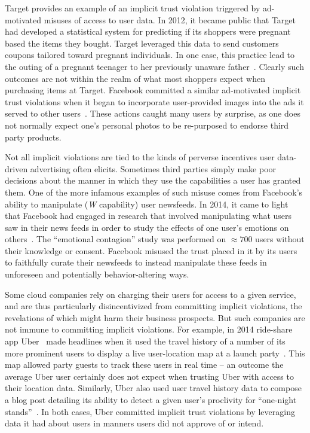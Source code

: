 Target provides an example of an implicit trust violation triggered by
ad-motivated misuses of access to user data. In 2012, it became public
that Target had developed a statistical system for predicting if its
shoppers were pregnant based the items they bought. Target leveraged
this data to send customers coupons tailored toward pregnant
individuals. In one case, this practice lead to the outing of a
pregnant teenager to her previously unaware
father~\cite{hill2012}. Clearly such outcomes are not within the realm
of what most shoppers expect when purchasing items at Target. Facebook
committed a similar ad-motivated implicit trust violations when it
began to incorporate user-provided images into the ads it served to
other users~\cite{mashable-socialads}. These actions caught many users
by surprise, as one does not normally expect one's personal photos to
be re-purposed to endorse third party products.

Not all implicit violations are tied to the kinds of perverse
incentives user data-driven advertising often elicits. Sometimes third
parties simply make poor decisions about the manner in which they use
the capabilities a user has granted them. One of the more infamous
examples of such misuse comes from Facebook's ability to manipulate
(\emph{W} capability) user newsfeeds. In 2014, it came to light that
Facebook had engaged in research that involved manipulating what users
saw in their news feeds in order to study the effects of one user's
emotions on others~\cite{goel2014}. The ``emotional contagion'' study
was performed on $\approx700$ users without their knowledge or
consent. Facebook misused the trust placed in it by its users to
faithfully curate their newsfeeds to instead manipulate these feeds
in unforeseen and potentially behavior-altering ways.

Some cloud companies rely on charging their users for access to a
given service, and are thus particularly disincentivized from
committing implicit violations, the revelations of which might harm
their business prospects. But such companies are not immune to
committing implicit violations. For example, in 2014 ride-share app
Uber~\cite{uber} made headlines when it used the travel history of a
number of its more prominent users to display a live user-location map
at a launch party~\cite{sims2014}. This map allowed party guests to
track these users in real time -- an outcome the average Uber user
certainly does not expect when trusting Uber with access to their
location data. Similarly, Uber also used user travel history data to
compose a blog post detailing its ability to detect a given user's
proclivity for ``one-night stands''~\cite{pagliery2014}. In both
cases, Uber committed implicit trust violations by leveraging data it
had about users in manners users did not approve of or intend.

